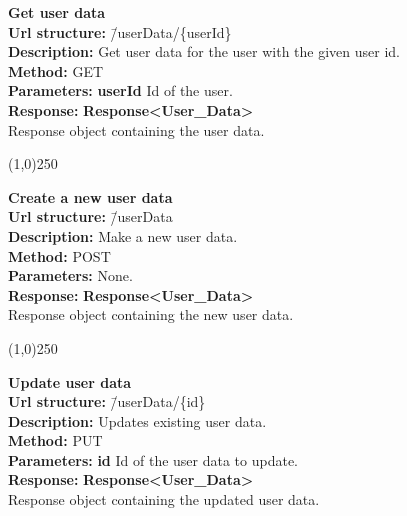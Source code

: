 \documentclass[11pt]{article}
\begin{document}
\begin{tabbing}
\textbf{Get user data} \\
\textcolor{black!60}{\textbf{Url structure:}} \hspace{0.2in} \= /userData/\{userId\} \\
\textcolor{black!60}{\textbf{Description:}}  \> Get user data for the user with the given user id. \\
\textcolor{black!60}{\textbf{Method:}} \> GET \\
\textcolor{black!60}{\textbf{Parameters:}} \> \textbf{userId} Id of the user. \\
\textcolor{black!60}{\textbf{Response:}} \> \textbf{Response<User\_Data>} \\
\> Response object containing the user data.
\end{tabbing}

\begin{center}\line(1,0){250}\end{center}

\begin{tabbing}
\textbf{Create a new user data} \\
\textcolor{black!60}{\textbf{Url structure:}} \hspace{0.2in} \= /userData \\
\textcolor{black!60}{\textbf{Description:}}  \> Make a new user data. \\
\textcolor{black!60}{\textbf{Method:}} \> POST \\
\textcolor{black!60}{\textbf{Parameters:}} \> None. \\
\textcolor{black!60}{\textbf{Response:}} \> \textbf{Response<User\_Data>} \\
\> Response object containing the new user data.
\end{tabbing}

\begin{center}\line(1,0){250}\end{center}

\begin{tabbing}
\textbf{Update user data} \\
\textcolor{black!60}{\textbf{Url structure:}} \hspace{0.2in} \= /userData/\{id\} \\
\textcolor{black!60}{\textbf{Description:}}  \> Updates existing user data. \\
\textcolor{black!60}{\textbf{Method:}} \> PUT \\
\textcolor{black!60}{\textbf{Parameters:}} \> \textbf{id} Id of the user data to update. \\
\textcolor{black!60}{\textbf{Response:}} \> \textbf{Response<User\_Data>} \\
\> Response object containing the updated user data.
\end{tabbing}
\end{document}
